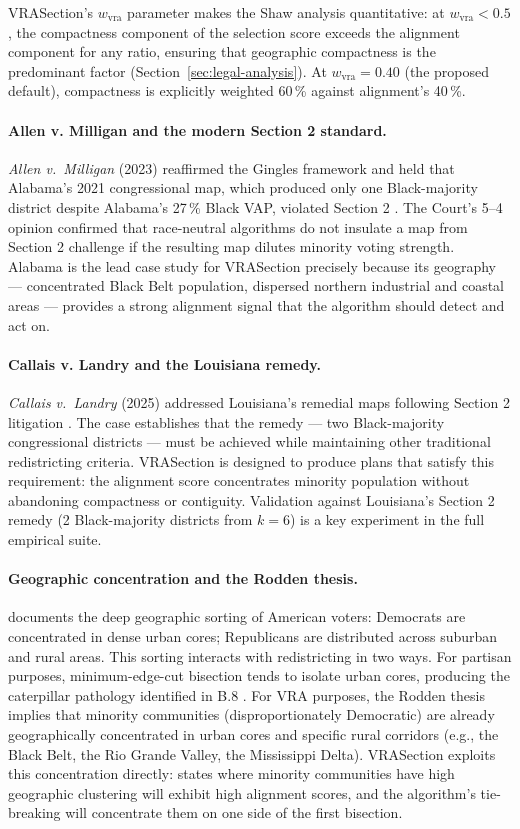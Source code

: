 VRASection's $w_\text{vra}$ parameter makes the Shaw analysis quantitative:
at $w_\text{vra} < 0.5$, the compactness component of the selection score
exceeds the alignment component for any ratio, ensuring that geographic
compactness is the predominant factor (Section~\ref{sec:legal-analysis}).
At $w_\text{vra} = 0.40$ (the proposed default), compactness is explicitly
weighted 60\,\% against alignment's 40\,\%.

\paragraph{Allen v. Milligan and the modern Section 2 standard.}
\emph{Allen v.\ Milligan} (2023) reaffirmed the Gingles framework and
held that Alabama's 2021 congressional map, which produced only one
Black-majority district despite Alabama's 27\,\% Black VAP, violated
Section 2 \citep{allen2023}.
The Court's 5--4 opinion confirmed that race-neutral algorithms do not
insulate a map from Section 2 challenge if the resulting map dilutes
minority voting strength.
Alabama is the lead case study for VRASection precisely because its
geography --- concentrated Black Belt population, dispersed northern
industrial and coastal areas --- provides a strong alignment signal that
the algorithm should detect and act on.

\paragraph{Callais v. Landry and the Louisiana remedy.}
\emph{Callais v.\ Landry} (2025) addressed Louisiana's remedial maps
following Section 2 litigation \citep{callais2025}.
The case establishes that the remedy --- two Black-majority congressional
districts --- must be achieved while maintaining other traditional
redistricting criteria.
VRASection is designed to produce plans that satisfy this requirement:
the alignment score concentrates minority population without abandoning
compactness or contiguity.
Validation against Louisiana's Section 2 remedy (2 Black-majority districts
from $k=6$) is a key experiment in the full empirical suite.

\paragraph{Geographic concentration and the Rodden thesis.}
\citet{rodden2019} documents the deep geographic sorting of American voters:
Democrats are concentrated in dense urban cores; Republicans are distributed
across suburban and rural areas.
This sorting interacts with redistricting in two ways.
For partisan purposes, minimum-edge-cut bisection tends to isolate urban
cores, producing the caterpillar pathology identified in B.8 \citep{b8paper}.
For VRA purposes, the Rodden thesis implies that minority communities
(disproportionately Democratic) are already geographically concentrated
in urban cores and specific rural corridors (e.g., the Black Belt, the
Rio Grande Valley, the Mississippi Delta).
VRASection exploits this concentration directly: states where minority
communities have high geographic clustering will exhibit high alignment
scores, and the algorithm's tie-breaking will concentrate them on one
side of the first bisection.

